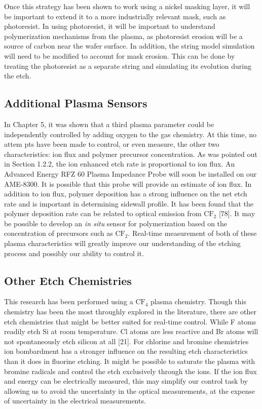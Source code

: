 Once this strategy has been shown to work using a nickel masking layer, it will be
important to extend it to a more industrially relevant mask, such as photoresist. In using
photoresist, it will be important to understand polymerization mechanisms from the plasma,
as photoresist erosion will be a source of carbon near the wafer surface. In addition, the
string model simulation will need to be modified to account for mask erosion. This can be
done by treating the photoresist as a separate string and simulating its evolution during
the etch.


\subsection{Additional Plasma Sensors}

\tab In Chapter 5, it was shown that a third plasma parameter could be independently
controlled by adding oxygen to the gas chemistry. At this time, no attem pts have been
made to control, or even measure, the other two characteristics: ion flux and polymer
precursor concentration. As was pointed out in Section 1.2.2, the ion enhanced etch rate is
proportional to ion flux. An Advanced Energy RFZ 60 Plasma Impedance Probe will soon
be installed on our AME-8300. It is possible that this probe will provide an estimate of
ion flux. In addition to ion flux, polymer deposition has a strong influence on the net etch
rate and is important in determining sidewall profile. It has been found that the polymer
deposition rate can be related to optical emission from $\text{CF}_{2}$ [78]. It may be possible to develop an \textit{in situ} sensor for polymerization based on the concentration of precursors such as $\text{CF}_{2}$. Real-time measurement of both of these plasma characteristics will greatly improve our understanding of the etching process and possibly our ability to control it.


\subsection{Other Etch Chemistries}

\tab This research has been performed using a $\text{CF}_{4}$ plasma chemistry. Though this chemistry has been the most throughly explored in the literature, there are other etch chemistries that might be better suited for real-time control. While F atoms readily etch Si at room temperature. Cl atoms are less reactive and Br atoms will not spontaneously etch silicon at all [21]. For chlorine and bromine chemistries ion bombardment has a stronger influence on the resulting etch characteristics than it does in fluorine etching. It might be possible to saturate the plasma with bromine radicals and control the etch exclusively through the ions. If the ion flux and energy can be electrically measured, this may simplify our control task by allowing us to avoid the uncertainty in the optical measurements, at the expense of uncertainty in the electrical measurements.

